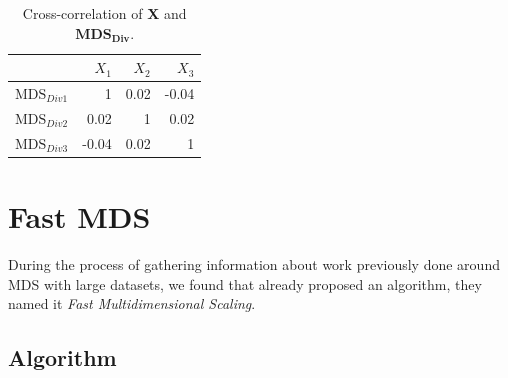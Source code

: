 \documentclass[11pt]{report}
\begin{document}
\FloatBarrier

\begin{table}[ht]
\centering
\begin{tabular}{r|rrr}
 & $X_1$ & $X_2$ & $X_3$ \\ 
  \hline
  $\mbox{MDS}_{Div1}$ & 1 & 0.02 & -0.04 \\ 
  $\mbox{MDS}_{Div2}$ & 0.02 & 1 & 0.02 \\ 
  $\mbox{MDS}_{Div3}$ & -0.04 & 0.02 & 1 \\ 
   \hline
\end{tabular}
\caption{Cross-correlation of \textbf{X} and $\mathbf{MDS_{Div}}$.} 
\label{corr_mds}
\end{table}



\section{Fast MDS}
During the process of gathering information about work previously done around
MDS with large datasets, we found that  already proposed an 
algorithm, they named it \textit{Fast Multidimensional Scaling}. 


\subsection{Algorithm}
\end{document}
